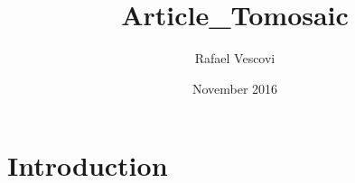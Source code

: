 \documentclass{article}
\title{Article_Tomosaic}
\author{Rafael Vescovi}
\date{November 2016}
\begin{document}
\maketitle

\section{Introduction}
\end{document}
